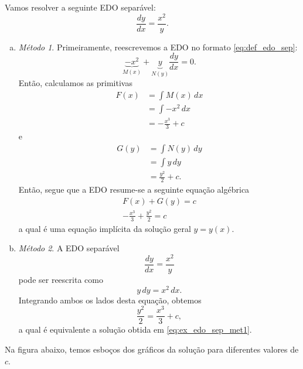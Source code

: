 \begin{ex}\label{ex:edo_sep_metsol}
  Vamos resolver a seguinte EDO separável:
  \begin{equation}
    \frac{dy}{dx} = \frac{x^2}{y}.
  \end{equation}
  \begin{enumerate}[a)]
  \item \emph{Método 1}.
    Primeiramente, reescrevemos a EDO no formato \eqref{eq:def_edo_sep}:
    \begin{equation}
      \underbrace{-x^2}_{M(x)} + \underbrace{y}_{N(y)}\frac{dy}{dx} = 0.
    \end{equation}
    Então, calculamos as primitivas
    \begin{align}
      F(x) &= \int M(x)\,dx\\
      &= \int -x^2\,dx \\
      &= -\frac{x^3}{3} + c
    \end{align}
    e
    \begin{align}
      G(y) &= \int N(y)\,dy \\
      &= \int y\,dy \\
      &= \frac{y^2}{2} + c.
    \end{align}
    Então, segue que a EDO resume-se a seguinte equação algébrica
    \begin{gather}
      F(x) + G(y) = c \\
      -\frac{x^3}{3} + \frac{y^2}{2} = c \label{eq:ex_edo_sep_met1}
    \end{gather}
    a qual é uma equação implícita da solução geral $y = y(x)$. 
    
  \item \emph{Método 2}.
    A EDO separável
    \begin{equation}
      \frac{dy}{dx} = \frac{x^2}{y}
    \end{equation}
    pode ser reescrita como
    \begin{equation}
      y\,dy = x^2\,dx.
    \end{equation}
    Integrando ambos os lados desta equação, obtemos
    \begin{equation}
      \frac{y^2}{2} = \frac{x^3}{3} + c,
    \end{equation}
    a qual é equivalente a solução obtida em \eqref{eq:ex_edo_sep_met1}.
  \end{enumerate}

  Na figura abaixo, temos esboços dos gráficos da solução para diferentes valores de $c$.


\end{ex}
